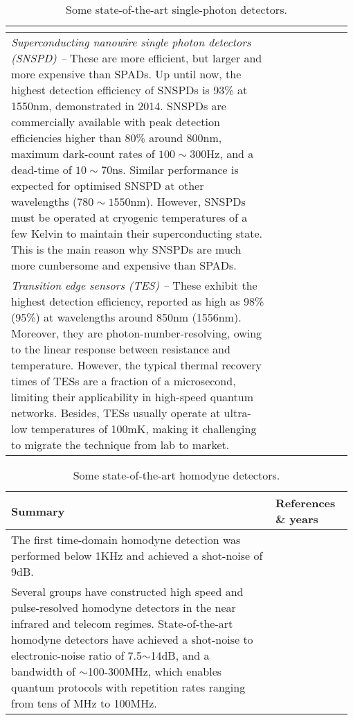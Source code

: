 \begin{table*}[!htbp]
\begin{tabular}{|p{0.755\linewidth}|p{0.22\linewidth}|}
\begin{itemize}
		\end{itemize} &  \cite{bib:shentu2013ultralow} \\
		\hline
		\textit{Superconducting nanowire single photon detectors (SNSPD) --} 
		These are more efficient, but larger and more expensive than SPADs. Up until now, the highest detection efficiency of SNSPDs is 93\% at 1550nm, demonstrated in 2014. SNSPDs are commercially available with peak detection efficiencies higher than 80\% around 800nm, maximum dark-count rates of $100\sim 300$Hz, and a dead-time of $10\sim 70$ns. Similar performance is expected for optimised SNSPD at other wavelengths ($780\sim 1550$nm). However, SNSPDs must be operated at cryogenic temperatures of a few Kelvin to maintain their superconducting state. This is the main reason why SNSPDs are much more cumbersome and expensive than SPADs. &  \cite{bib:marsili2013} \\
		\hline
		\textit{Transition edge sensors (TES) --}
		These exhibit the highest detection efficiency, reported as high as 98\% (95\%) at wavelengths around 850nm (1556nm). Moreover, they are photon-number-resolving, owing to the linear response between resistance and temperature. However, the typical thermal recovery times of TESs are a fraction of a microsecond, limiting their applicability in high-speed quantum networks. Besides, TESs usually operate at ultra-low temperatures of 100mK, making it challenging to migrate the technique from lab to market. & \cite{bib:fukuda2011, bib:lita2008} \\
		\hline
	\end{tabular}
	\captionspacetab \caption{Some state-of-the-art single-photon detectors.}\label{tab:photodetection}
\end{table*}

\begin{table*}[!htbp]
	\begin{tabular}{|p{0.755\linewidth}|p{0.22\linewidth}|}
		\hline
	\textbf{Summary} & \textbf{References \& years} \\	\hline \hline
		The first time-domain homodyne detection was performed below 1KHz and achieved a shot-noise of 9dB. & \cite{bib:Smithey1993} \\
		\hline
		Several groups have constructed high speed and pulse-resolved homodyne detectors in the near infrared and telecom regimes. State-of-the-art homodyne detectors have achieved a shot-noise to electronic-noise ratio of 7.5$\sim$14dB, and a bandwidth of $\sim$100-300MHz, which enables quantum protocols with repetition rates ranging from tens of MHz to 100MHz. & \cite{bib:zavatta2002time, bib:okubo2008pulse, bib:kumar2012versatile, bib:chi2011balanced, bib:duan2013} \\
		\hline
	\end{tabular}
	\captionspacetab \caption{Some state-of-the-art homodyne detectors.} \label{tab:homodyning}
\end{table*}

